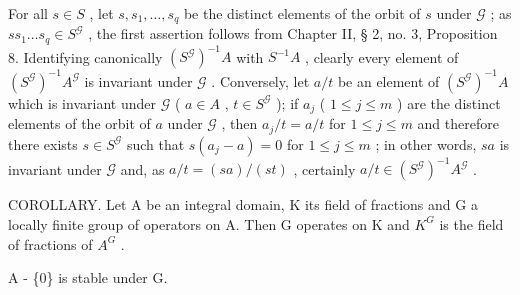 For all \(s \in S\) , let \(s, s_1, \ldots, s_q\) be the distinct elements of the orbit of \(s\) under \(\mathcal{G}\) ; as \(ss_1 \ldots s_q \in S^{\mathcal{G}}\) , the first assertion follows from Chapter II, § 2, no. 3, Proposition 8. Identifying canonically \((S^{\mathcal{G}})^{-1}A\) with \(S^{-1}A\) , clearly every element of \((S^{\mathcal{G}})^{-1}A^{\mathcal{G}}\) is invariant under \(\mathcal{G}\) . Conversely, let \(a/t\) be an element of \((S^{\mathcal{G}})^{-1}A\) which is invariant under \(\mathcal{G}\) ( \(a \in A\) , \(t \in S^{\mathcal{G}}\) ); if \(a_j\) ( \(1 \leqslant j \leqslant m\) ) are the distinct elements of the orbit of \(a\) under \(\mathcal{G}\) , then \(a_j/t = a/t\) for \(1 \leqslant j \leqslant m\) and therefore there exists \(s \in S^{\mathcal{G}}\) such that \(s(a_j - a) = 0\) for \(1 \leqslant j \leqslant m\) ; in other words, \(sa\) is invariant under \(\mathcal{G}\) and, as \(a/t = (sa)/(st)\) , certainly \(a/t \in (S^{\mathcal{G}})^{-1}A^{\mathcal{G}}\) .

COROLLARY. Let A be an integral domain, K its field of fractions and G a locally finite group of operators on A. Then G operates on K and \(K^{G}\) is the field of fractions of \(A^{G}\) .

A - \{0\} is stable under G.

